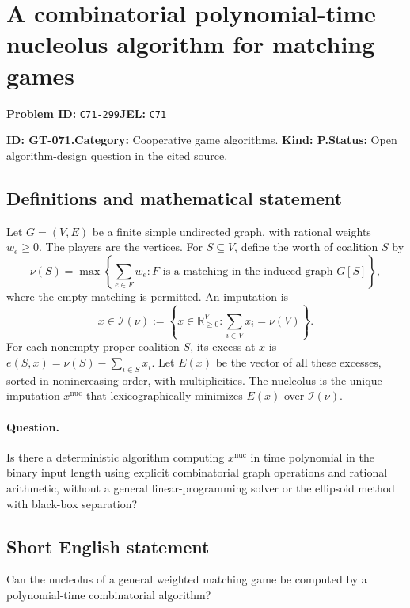 \documentclass[11pt,a4paper]{article}
\begin{document}
\section*{A combinatorial polynomial-time nucleolus algorithm for matching games}
\textbf{Problem ID:} \texttt{C71-299}\quad \textbf{JEL:} \texttt{C71}\par
\label{problem:OP-0201}
\label{game:GT-071}
{\sffamily\small\color{muted}
\noindent\textbf{ID: GT-071.}\quad\textbf{Category:} Cooperative game algorithms.
\quad\textbf{Kind: P.}\quad\textbf{Status:} Open algorithm-design question in the cited source.
\par}
\subsection*{Definitions and mathematical statement}
Let \(G=(V,E)\) be a finite simple undirected graph, with rational
weights \(w_e\geq 0\). The players are the vertices. For \(S\subseteq V\),
define the worth of coalition \(S\) by
\[
 \nu(S)=
 \max\left\{\sum_{e\in F}w_e:
              F\text{ is a matching in the induced graph }G[S]\right\},
\]
where the empty matching is permitted. An imputation is
\[
 x\in\mathcal I(\nu)
   :=\left\{x\in\mathbb R_{\geq 0}^{V}:
                         \sum_{i\in V}x_i=\nu(V)\right\}.
\]
For each nonempty proper coalition \(S\), its excess at \(x\) is
\(e(S,x)=\nu(S)-\sum_{i\in S}x_i\).
Let \(E(x)\) be the vector of all these excesses, sorted in
nonincreasing order, with multiplicities. The nucleolus is the unique
imputation \(x^{\mathrm{nuc}}\) that lexicographically minimizes
\(E(x)\) over \(\mathcal I(\nu)\).

\paragraph{Question.}
Is there a deterministic algorithm computing \(x^{\mathrm{nuc}}\)
in time polynomial in the binary input length using explicit
combinatorial graph operations and rational arithmetic, without a
general linear-programming solver or the ellipsoid method with
black-box separation?

\subsection*{Short English statement}
Can the nucleolus of a general weighted matching game be computed by
a polynomial-time combinatorial algorithm?
\end{document}
